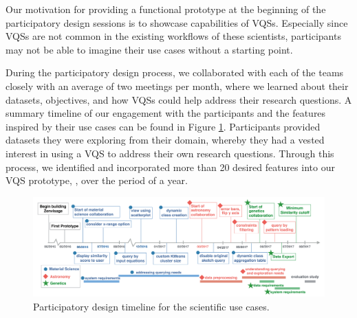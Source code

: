 Our motivation for providing a functional prototype at the beginning of the participatory design sessions is to showcase capabilities of VQSs. Especially since VQSs are not common in the existing workflows of these scientists, participants may not be able to imagine their use cases without a starting point.
\par During the participatory design process, we collaborated with each of the teams closely with an average of two meetings per month, where we learned about their datasets, objectives, and how VQSs could help address their research questions. A summary timeline of our engagement with the participants and the features inspired by their use cases can be found in Figure \ref{timeline}. Participants provided datasets they were exploring from their domain, whereby they had a vested interest in using a VQS to address their own research questions. Through this process, we identified and incorporated more than 20 desired features into our VQS prototype, \zv, over the period of a year.
\begin{figure}[!ht]
	\centering
	\captionsetup{justification=centering,margin=2cm}
	\vspace{-10pt}
	\includegraphics[width=6in]{figures/timeline_new.pdf}
	\vspace{-6pt}\caption{Participatory design timeline for the scientific use cases.}
	\label{timeline}
	\vspace{-10pt}
\end{figure}

